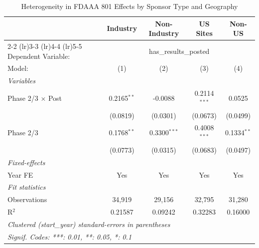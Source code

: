 
\begin{table}[htbp]
   \caption{\label{tab:hetero} Heterogeneity in FDAAA 801 Effects by Sponsor Type and Geography}
   \centering
   \begin{tabular}{lcccc}
      \tabularnewline \midrule \midrule
       & Industry & Non-Industry & US Sites & Non-US \\ \cmidrule(lr){2-2} \cmidrule(lr){3-3} \cmidrule(lr){4-4} \cmidrule(lr){5-5}
      Dependent Variable: & \multicolumn{4}{c}{has\_results\_posted}\\
      Model:                   & (1)           & (2)            & (3)            & (4)\\  
      \midrule
      \emph{Variables}\\
      Phase 2/3 $\times$ Post  & 0.2165$^{**}$ & -0.0088        & 0.2114$^{***}$ & 0.0525\\   
                               & (0.0819)      & (0.0301)       & (0.0673)       & (0.0499)\\   
      Phase 2/3                & 0.1768$^{**}$ & 0.3300$^{***}$ & 0.4008$^{***}$ & 0.1334$^{**}$\\   
                               & (0.0773)      & (0.0315)       & (0.0683)       & (0.0497)\\   
      \midrule
      \emph{Fixed-effects}\\
      Year FE                  & Yes           & Yes            & Yes            & Yes\\  
      \midrule
      \emph{Fit statistics}\\
      Observations             & 34,919        & 29,156         & 32,795         & 31,280\\  
      R$^2$                    & 0.21587       & 0.09242        & 0.32283        & 0.16000\\  
      \midrule \midrule
      \multicolumn{5}{l}{\emph{Clustered (start\_year) standard-errors in parentheses}}\\
      \multicolumn{5}{l}{\emph{Signif. Codes: ***: 0.01, **: 0.05, *: 0.1}}\\
   \end{tabular}
\par{}
\end{table}


